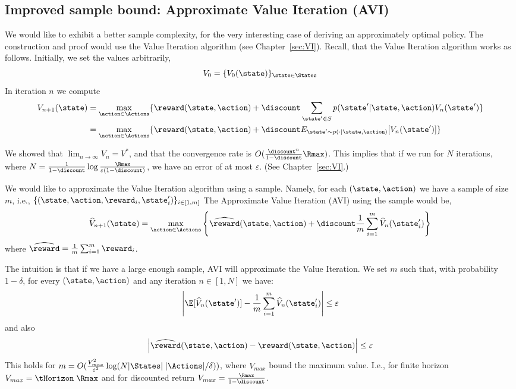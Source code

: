 \subsection{Improved sample bound: Approximate Value
Iteration (AVI)}

We would like to exhibit a better sample complexity, for the very
interesting case of deriving an approximately optimal policy. The
construction and proof would use the Value Iteration algorithm (see
Chapter~\ref{sec:VI}).
%
Recall, that the Value Iteration algorithm works as follows.
Initially, we set the values arbitrarily,
\[
V_0=\{V_0(\state)\}_{\state \in \States}
\]
In iteration $n$ we compute
\begin{align*}
V_{n+1}(\state)&=\max_{\action\in \Actions} \{
\reward(\state,\action)+\discount \sum_{\state'\in S}
p(\state'|\state,\action)
V_n(\state')\}\\
&=\max_{\action\in \Actions} \{ \reward(\state,\action)+\discount
E_{\state'\sim p(\cdot |\state,\action)} [V_n(\state')]\}
\end{align*}

We showed that $\lim_{n\rightarrow \infty}V_n =V^*$, and that the
convergence rate is $O(\frac{\discount^n}{1-\discount}\Rmax)$.
%
This implies that if we run for $N$ iterations, where
$N=\frac{1}{1-\discount}\log
\frac{\Rmax}{\varepsilon(1-\discount)}$, we have an error of at most
$\varepsilon$. (See Chapter~\ref{sec:VI}.)


We would like to approximate the Value Iteration algorithm using a
sample. Namely, for each $(\state,\action)$ we have a sample of size
$m$, i.e., $\{(\state,\action,\reward_i,\state'_i)\}_{i\in[1,m]}$
The Approximate Value Iteration (AVI) using the sample would be,
\[
\widehat{V}_{n+1}(\state)=\max_{\action\in \Actions} \left\{
\widehat{\reward}(\state,\action)+\discount \frac{1}{m}\sum_{i=1}^m
\widehat{V}_n(\state'_i)\right\}
\]
where $\widehat{\reward}=\frac{1}{m}\sum_{i=1}^m \reward_i$.

The intuition is that if we have a large enough sample, AVI  will
approximate the Value Iteration. We set $m$ such that, with
probability $1-\delta$, for every $(\state,\action)$ and any
iteration $n\in[1,N]$ we have:
\[
\left|\E[\widehat{V}_n(\state')]-\frac{1}{m}\sum_{i=1}^m
\widehat{V}_n(\state'_i)\right|\leq \varepsilon
\]
and also
\[
\left|\widehat{\reward}(\state,\action)-\reward(\state,\action)\right|\leq\varepsilon
\]
This holds for $m=O(\frac{V^2_{max}}{\varepsilon^2}\log (N
|\States|\;|\Actions|/\delta))$, where $V_{max}$ bound the maximum
value. I.e., for finite horizon $V_{max}=\tHorizon\; \Rmax$ and for
discounted return $V_{max}=\frac{\Rmax}{1-\discount}$.

